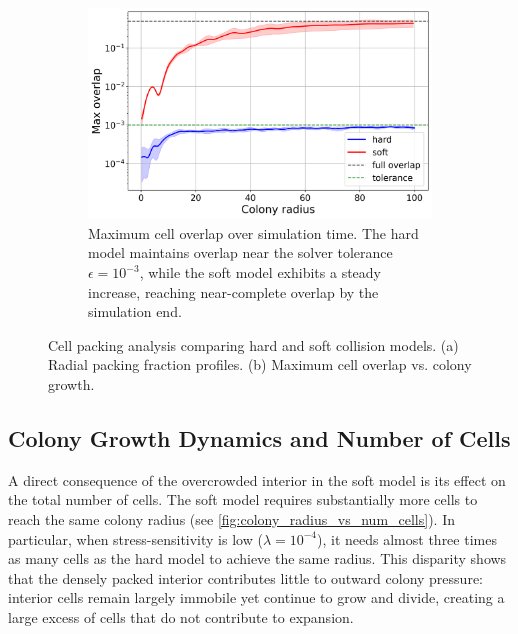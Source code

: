 \documentclass[conference]{IEEEtran}
\begin{document}
\begin{figure}[H]
    \begin{subfigure}[b]{\linewidth}
        \centering
        \includegraphics[width=\linewidth]{figures/comparison_plots/combined_colony_radius_vs_max_overlap_with_lines.png}
        \caption{Maximum cell overlap over simulation time. The hard model maintains overlap near the solver tolerance $\epsilon = 10^{-3}$, while the soft model exhibits a steady increase, reaching near-complete overlap by the simulation end.}
        \label{fig:max_overlap_simulation}
    \end{subfigure}

    \caption{Cell packing analysis comparing hard and soft collision models. (a) Radial packing fraction profiles. (b) Maximum cell overlap vs. colony growth.}
    \label{fig:combined_packing_analysis}
\end{figure}

\subsection{Colony Growth Dynamics and Number of Cells}
\label{sec:colony_growth_dynamics}

A direct consequence of the overcrowded interior in the soft model is its effect on the total number of cells. The soft model requires substantially more cells to reach the same colony radius (see \autoref{fig:colony_radius_vs_num_cells}). In particular, when stress-sensitivity is low ($\lambda = 10^{-4}$), it needs almost three times as many cells as the hard model to achieve the same radius. This disparity shows that the densely packed interior contributes little to outward colony pressure: interior cells remain largely immobile yet continue to grow and divide, creating a large excess of cells that do not contribute to expansion.
\end{document}
